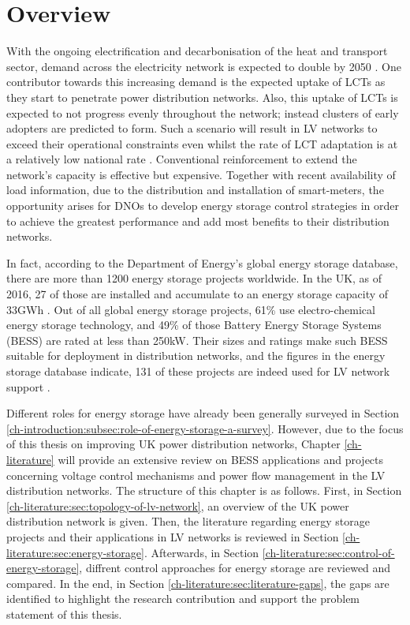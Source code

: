 \section{Overview}
\label{ch-literature:sec:overview}

With the ongoing electrification and decarbonisation of the heat and transport sector, demand across the electricity network is expected to double by 2050 \cite{Wilks2010}.
One contributor towards this increasing demand is the expected uptake of LCTs as they start to penetrate power distribution networks.
Also, this uptake of LCTs is expected to not progress evenly throughout the network; instead clusters of early adopters are predicted to form.
Such a scenario will result in LV networks to exceed their operational constraints even whilst the rate of LCT adaptation is at a relatively low national rate \cite{Poghosyan2014}.
Conventional reinforcement to extend the network's capacity is effective but expensive.
Together with recent availability of load information, due to the distribution and installation of smart-meters, the opportunity arises for DNOs to develop energy storage control strategies in order to achieve the greatest performance and add most benefits to their distribution networks.

In fact, according to the Department of Energy's global energy storage database, there are more than 1200 energy storage projects worldwide.
In the UK, as of 2016, 27 of those are installed and accumulate to an energy storage capacity of 33GWh \cite{Garton2016}.
Out of all global energy storage projects, 61\% use electro-chemical energy storage technology, and 49\% of those Battery Energy Storage Systems (BESS) are rated at less than 250kW.
Their sizes and ratings make such BESS suitable for deployment in distribution networks, and the figures in the energy storage database indicate, 131 of these projects are indeed used for LV network support \cite{DOE-GESD}.

Different roles for energy storage have already been generally surveyed in Section \ref{ch-introduction:subsec:role-of-energy-storage-a-survey}.
However, due to the focus of this thesis on improving UK power distribution networks, Chapter \ref{ch-literature} will provide an extensive review on BESS applications and projects concerning voltage control mechanisms and power flow management in the LV distribution networks.
The structure of this chapter is as follows.
First, in Section \ref{ch-literature:sec:topology-of-lv-network}, an overview of the UK power distribution network is given.
Then, the literature regarding energy storage projects and their applications in LV networks is reviewed in Section \ref{ch-literature:sec:energy-storage}.
Afterwards, in Section \ref{ch-literature:sec:control-of-energy-storage}, diffrent control approaches for energy storage are reviewed and compared.
In the end, in Section \ref{ch-literature:sec:literature-gaps}, the gaps are identified to highlight the research contribution and support the problem statement of this thesis.
